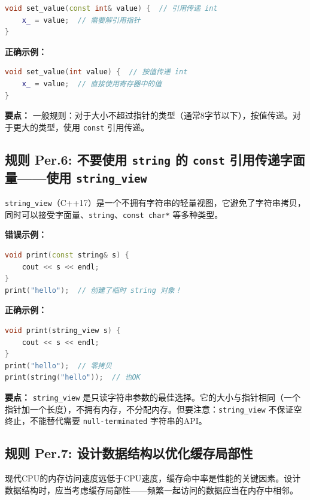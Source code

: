 \begin{lstlisting}[language=C++]
void set_value(const int& value) {  // 引用传递 int
    x_ = value;  // 需要解引用指针
}
\end{lstlisting}

\textbf{正确示例：}

\begin{lstlisting}[language=C++]
void set_value(int value) {  // 按值传递 int
    x_ = value;  // 直接使用寄存器中的值
}
\end{lstlisting}

\textbf{要点：} 一般规则：对于大小不超过指针的类型（通常8字节以下），按值传递。对于更大的类型，使用 \texttt{const} 引用传递。

\subsection*{\textbf{规则 Per.6:} 不要使用 \texttt{string} 的 \texttt{const} 引用传递字面量——使用 \texttt{string\_view}}

\texttt{string\_view}（C++17）是一个不拥有字符串的轻量视图，它避免了字符串拷贝，同时可以接受字面量、\texttt{string}、\texttt{const char*} 等多种类型。

\textbf{错误示例：}

\begin{lstlisting}[language=C++]
void print(const string& s) {
    cout << s << endl;
}
print("hello");  // 创建了临时 string 对象！
\end{lstlisting}

\textbf{正确示例：}

\begin{lstlisting}[language=C++]
void print(string_view s) {
    cout << s << endl;
}
print("hello");  // 零拷贝
print(string("hello"));  // 也OK
\end{lstlisting}

\textbf{要点：} \texttt{string\_view} 是只读字符串参数的最佳选择。它的大小与指针相同（一个指针加一个长度），不拥有内存，不分配内存。但要注意：\texttt{string\_view} 不保证空终止，不能替代需要 \texttt{null-terminated} 字符串的API。

\subsection*{\textbf{规则 Per.7:} 设计数据结构以优化缓存局部性}

现代CPU的内存访问速度远低于CPU速度，缓存命中率是性能的关键因素。设计数据结构时，应当考虑缓存局部性——频繁一起访问的数据应当在内存中相邻。

